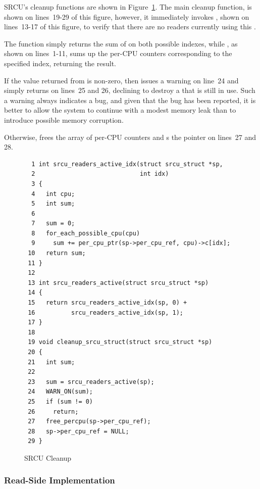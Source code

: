 SRCU's cleanup functions are shown in
Figure~\ref{fig:app:rcuimpl:SRCU Cleanup}.
The main cleanup function,  is shown
on lines~19-29 of this figure, however, it immediately invokes
, shown on lines~13-17 of this figure,
to verify that there are no readers currently using this
 .

The  function simply returns the sum of
 on both possible indexes,
while , as shown on lines~1-11,
sums up the per-CPU counters corresponding to the specified index,
returning the result.

If the value returned from  is non-zero,
then  issues a warning on line~24 and
simply returns on lines~25 and 26, declining to destroy a
  that is still in use.
Such a warning always indicates a bug, and given that the bug
has been reported, it is better to allow the system to continue
with a modest memory leak than to introduce possible memory corruption.

Otherwise,  frees the array of per-CPU
counters and s the pointer on lines~27 and 28.

\begin{figure}[htbp]
{ \scriptsize
\begin{verbatim}
  1 int srcu_readers_active_idx(struct srcu_struct *sp,
  2                             int idx)
  3 {
  4   int cpu;
  5   int sum;
  6
  7   sum = 0;
  8   for_each_possible_cpu(cpu)
  9     sum += per_cpu_ptr(sp->per_cpu_ref, cpu)->c[idx];
 10   return sum;
 11 }
 12
 13 int srcu_readers_active(struct srcu_struct *sp)
 14 {
 15   return srcu_readers_active_idx(sp, 0) +
 16          srcu_readers_active_idx(sp, 1);
 17 }
 18
 19 void cleanup_srcu_struct(struct srcu_struct *sp)
 20 {
 21   int sum;
 22
 23   sum = srcu_readers_active(sp);
 24   WARN_ON(sum);
 25   if (sum != 0)
 26     return;
 27   free_percpu(sp->per_cpu_ref);
 28   sp->per_cpu_ref = NULL;
 29 }
\end{verbatim}
}
\caption{SRCU Cleanup}
\label{fig:app:rcuimpl:SRCU Cleanup}
\end{figure}

\subsubsection{Read-Side Implementation}
\label{sec:app:rcuimpl:Read-Side Implementation}

